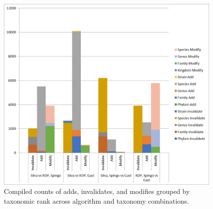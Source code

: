 \begin{figure}
	\centering
	\includegraphics[scale=0.80]{figures/mbvl_chart.png}
	\caption{Compiled counts of adds, invalidates, and modifies grouped by taxonomic rank across algorithm and taxonomy combinations.}
	\label{mbvl_chart}
\end{figure}